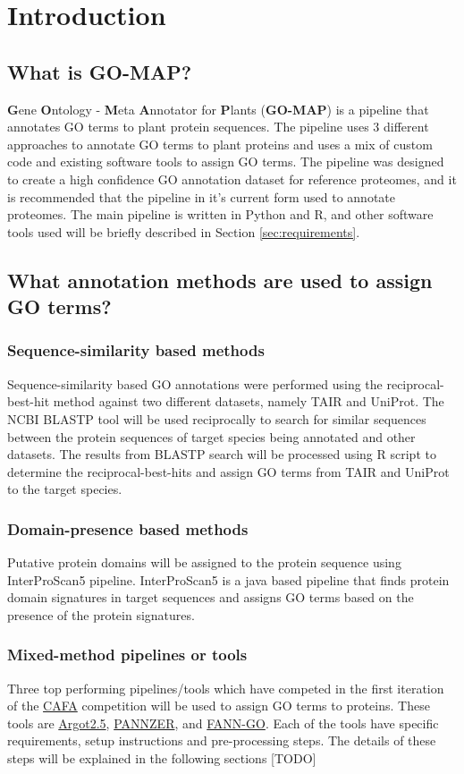 \section{Introduction}
\label{sec:intro}

\subsection{What is GO-MAP?}
\textbf{G}ene \textbf{O}ntology - \textbf{M}eta \textbf{A}nnotator for \textbf{P}lants (\textbf{GO-MAP}) is a pipeline that annotates GO terms to plant protein sequences. The pipeline uses 3 different approaches to annotate GO terms to plant proteins and uses a mix of custom code and existing software tools to assign GO terms. The pipeline was designed to create a high confidence GO annotation dataset for reference proteomes, and it is recommended that the pipeline in it's current form used to annotate proteomes. The main pipeline is written in Python and R, and other software tools used will be briefly described in Section \ref{sec:requirements}. 

\subsection{What annotation methods are used to assign GO terms?}
\subsubsection{Sequence-similarity based methods}
Sequence-similarity based GO annotations were performed using the reciprocal-best-hit method against two different datasets, namely TAIR and UniProt. The NCBI BLASTP tool will be used reciprocally to search for similar sequences between the protein sequences of target species being annotated and other datasets. The results from BLASTP search will be processed using R script to determine the reciprocal-best-hits and assign GO terms from TAIR and UniProt to the target species.

\subsubsection{Domain-presence based methods}
Putative protein domains will be assigned to the protein sequence using InterProScan5 pipeline. InterProScan5 is a java based pipeline that finds protein domain signatures in target sequences and assigns GO terms based on the presence of the protein signatures.

\subsubsection{Mixed-method pipelines or tools}
Three top performing pipelines/tools which have competed in the first iteration of the \href{http://biofunctionprediction.org}{CAFA} competition will be used to assign GO terms to proteins. These tools are \href{http://www.medcomp.medicina.unipd.it/Argot2-5/}{Argot2.5}, \href{http://ekhidna.biocenter.helsinki.fi/pannzer}{PANNZER}, and \href{http://montana.informatics.indiana.edu/fanngo/fanngo.html}{FANN-GO}. Each of the tools have specific requirements, setup instructions and pre-processing steps. The details of these steps will be explained in the following sections [TODO]